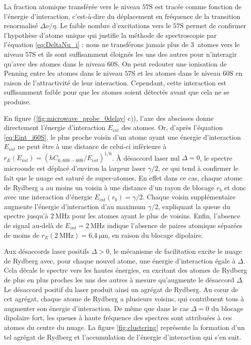 La fraction atomique transférée vers le niveau $\mathrm{57S}$ est tracée comme fonction de l'énergie d'interaction, c'est-à-dire du déplacement en fréquence de la transition renormalisé $\Delta\nu/\eta$.
Le faible nombre d'excitations vers le $\mathrm{57S}$ permet de confirmer l'hypothèse d'atome unique qui justifie la méthode de spectroscopie par l'équation \eqref{eq:DeltaNu_i} : nous ne transférons jamais plus de $\SI{3}{}$ atomes vers le niveau $\mathrm{57S}$ et ils sont suffisamment éloignés les uns des autres pour n'interagir qu'avec des atomes dans le niveau $\mathrm{60S}$.
On peut redouter une ionisation de Penning entre les atomes dans le niveau $\mathrm{57S}$ et les atomes dans le niveau $\mathrm{60S}$ en raison de l'attractivité de leur interaction.
Cependant, cette interaction est suffisamment faible pour que les atomes soient détectés avant que cela ne se produise. %

En figure (\ref{fig:microwave_probe_0delay} c)), l'axe des abscisses donne directement l'énergie d'interaction $E_{int}$ des atomes.
Or, d'après l'équation \eqref{eq:Eint_i60S}, le plus proche voisin d'un atome ayant une énergie d'interaction $E_{int}$ ne peut être à une distance de celui-ci inférieure à $r_E(E_{int}) = (hC_{6,\mathrm{60S-60S}}/E_{int})^{1/6}$.
\`A désaccord laser nul $\Delta = 0$, le spectre microonde est déplacé d'environ la largeur laser $\gamma/2$, ce qui tend à confirmer le fait que le nuage est saturé de super-atomes.
En effet dans ce cas, chaque atome de Rydberg a au moins un voisin à une distance d'un rayon de blocage $r_b$ et donc avec une interaction d'énergie $E_{int}(r_b) = \gamma/2$.
Chaque voisin supplémentaire augmente l'énergie d'interaction d'au maximum $\gamma/2$, expliquant la queue du spectre jusqu'à $\SI{2}{\MHz}$ pour les atomes ayant le plus de voisins.
Enfin, l'absence de signal au-delà de $E_{int} = \SI{2}{\MHz}$ indique l'absence de paires atomique séparées de moins de $r_E(\SI{2}{\MHz}) = \SI{6.4}{\um}$, en raison du blocage dipolaire.
	
Aux désaccords laser positifs $\Delta > 0$, le mécanisme de facilitation excite le nuage de Rydberg avec, pour chaque nouvel atome, une énergie d'interaction égale à $\Delta$.
Cela décale le spectre vers les hautes énergies, en excitant des atomes de Rydberg de plus en plus proches les uns des autres à mesure qu'augmente le désaccord $\Delta$.
Le désaccord positif du laser produit ainsi un agrégat de Rydberg.
Au c\oe ur de cet agrégat, chaque atome de Rydberg a plusieurs voisins, qui contribuent tous à augmenter son énergie d'interaction.
De même que dans le cas $\Delta = 0$ du blocage dipolaire fort, les queues à haute fréquence  des spectres sont attribuées à ces atomes du centre du nuage.
La figure \eqref{fig:clustering} représente la formation d'un tel agrégat de Rydberg et l'accumulation de l'énergie d'interaction qui s'en suit.

